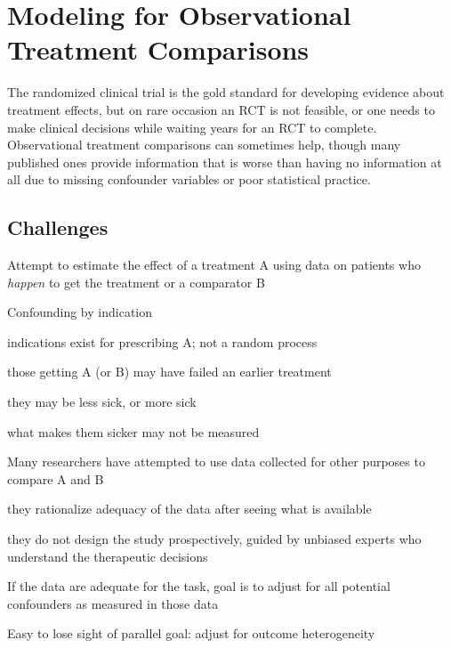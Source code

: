 \chapter{Modeling for Observational Treatment Comparisons}


The randomized clinical trial is the gold standard for developing
evidence about treatment effects, but on rare occasion an RCT is not
feasible, or one needs to make clinical decisions while waiting years
for an RCT to complete.  Observational treatment comparisons can
sometimes help, though many published ones provide information that is
worse than having no information at all due to missing confounder
variables or poor statistical practice.

\section{Challenges}
\bi
\item Attempt to estimate the effect of a treatment A using data on
  patients who \emph{happen} to get the treatment or a comparator B
\item Confounding by indication
  \bi
  \item indications exist for prescribing A; not a random process
  \item those getting A (or B) may have failed an earlier treatment
  \item they may be less sick, or more sick
  \item what makes them sicker may not be measured
    \ei
\item Many researchers have attempted to use data collected for other
  purposes to compare A and B
  \bi
  \item they rationalize adequacy of the data after seeing what is
    available
  \item they do not design the study prospectively, guided by unbiased
    experts who understand the therapeutic decisions
    \ei
\item If the data are adequate for the task, goal is to adjust for all
  potential confounders as measured in those data
\item Easy to lose sight of parallel goal: adjust for outcome heterogeneity
\ei
  
